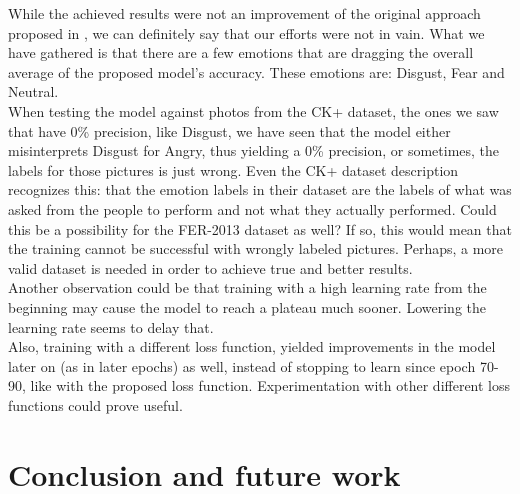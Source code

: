 \documentclass[runningheads,a4paper,11pt]{report}
\begin{document}
\pagebreak



While the achieved results were not an improvement of the original approach proposed in \cite{Arriaga17}, we can definitely say that our efforts were not in vain. What we have gathered is that there are a few emotions that are dragging the overall average of the proposed model's accuracy. These emotions are: Disgust, Fear and Neutral.\\
When testing the model against photos from the CK+ dataset, the ones we saw that have 0\% precision, like Disgust, we have seen that the model either misinterprets Disgust for Angry, thus yielding a 0\% precision, or sometimes, the labels for those pictures is just wrong. Even the CK+ dataset description recognizes this: that the emotion labels in their dataset are the labels of what was asked from the people to perform and not what they actually performed. Could this be a possibility for the FER-2013 dataset as well? If so, this would mean that the training cannot be successful with wrongly labeled pictures.
Perhaps, a more valid dataset is needed in order to achieve true and better results.\\
Another observation could be that training with a high learning rate from the beginning may cause the model to reach a plateau much sooner. Lowering the learning rate seems to delay that.\\
Also, training with a different loss function, yielded improvements in the model later on (as in later epochs) as well, instead of stopping to learn since epoch 70-90, like with the proposed loss function. Experimentation with other different loss functions could prove useful.





\chapter{Conclusion and future work}
\label{chapter:concl}




\end{document}
